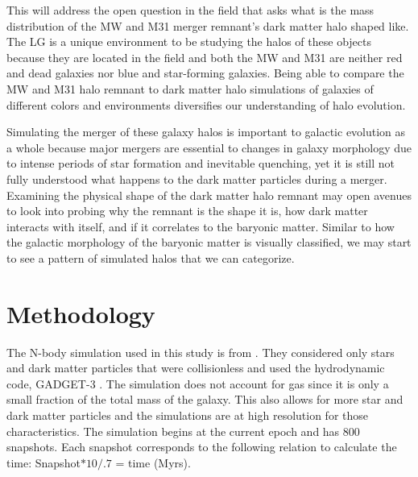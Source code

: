 \documentclass[linenumbers, twocolumn]{aastex631}
\begin{document}
This will address the open question in the field that asks what is the mass distribution of the MW and M31 merger remnant's dark matter halo shaped like. The LG is a unique environment to be studying the halos of these objects because they are located in the field and both the MW and M31 are neither red and dead galaxies nor blue and star-forming galaxies. Being able to compare the MW and M31 halo remnant to dark matter halo simulations of galaxies of different colors and environments diversifies our understanding of halo evolution.



Simulating the merger of these galaxy halos is important to galactic evolution as a whole because major mergers are essential to changes in galaxy morphology due to intense periods of star formation and inevitable quenching, yet it is still not fully understood what happens to the dark matter particles during a merger. Examining the physical shape of the dark matter halo remnant may open avenues to look into probing why the remnant is the shape it is, how dark matter interacts with itself, and if it correlates to the baryonic matter. Similar to how the galactic morphology of the baryonic matter is visually classified, we may start to see a pattern of simulated halos that we can categorize.


\section{Methodology} \label{sec:methodology}

The N-body simulation used in this study is from \cite{2012VanDerMarel}. They considered only stars and dark matter particles that were collisionless and used the hydrodynamic code, GADGET-3 \cite{GADGET2005}. The simulation does not account for gas since it is only a small fraction of the total mass of the galaxy. This also allows for more star and dark matter particles and the simulations are at high resolution for those characteristics. The simulation begins at the current epoch and has 800 snapshots. Each snapshot corresponds to the following relation to calculate the time: Snapshot$*10/.7$ = time (Myrs).
\end{document}
